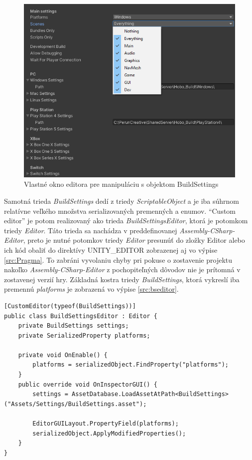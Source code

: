 \documentclass[slovak, bachelorpractice]{diploma}
\begin{document}
\begin{figure}[!htbp]
	\centering
	\includegraphics[width=.90\textwidth]{Pictures/buildDetail.png}
	\caption{Vlastné okno editora pre manipuláciu s objektom BuildSettings}
	\label{pic:Custom}
\end{figure}

Samotná trieda \textit{BuildSettings} dedí z triedy \textit{ScriptableObject} a je iba súhrnom relatívne veľkého množstva serializovaných premenných a enumov. \enquote{Custom editor} je potom realizovaný ako trieda \textit{BuildSettingsEditor}, ktorá je potomkom triedy \textit{Editor}. Táto trieda sa nachádza v preddefinovanej \textit{Assembly-CSharp-Editor}, preto je nutné potomkov triedy \textit{Editor} presunúť do zložky Editor alebo ich kód obaliť do direktívy UNITY\_EDITOR zobrazenej aj vo výpise \ref{src:Pragma}. To zabráni vyvolaniu chyby pri pokuse o zostavenie projektu nakoľko \textit{Assembly-CSharp-Editor} z pochopiteľných dôvodov nie je prítomná v zostavenej verzií hry. Základná kostra triedy \textit{BuildSettings}, ktorá vykreslí iba premennú \textit{platforms} je zobrazená vo výpise \ref{src:bseditor}.

\vspace{10pt}
\begin{lstlisting}[label=src:bseditor,caption={Kostra triedy určenej pre vykreslenie vlastného okna v editore Unity}]
[CustomEditor(typeof(BuildSettings))]
public class BuildSettingsEditor : Editor {
    private BuildSettings settings;
    private SerializedProperty platforms;
    
    private void OnEnable() {
        platforms = serializedObject.FindProperty("platforms");
    }
    public override void OnInspectorGUI() {
        settings = AssetDatabase.LoadAssetAtPath<BuildSettings>("Assets/Settings/BuildSettings.asset");
        
        EditorGUILayout.PropertyField(platforms);
        serializedObject.ApplyModifiedProperties();
    }
}
\end{lstlisting}
\end{document}
